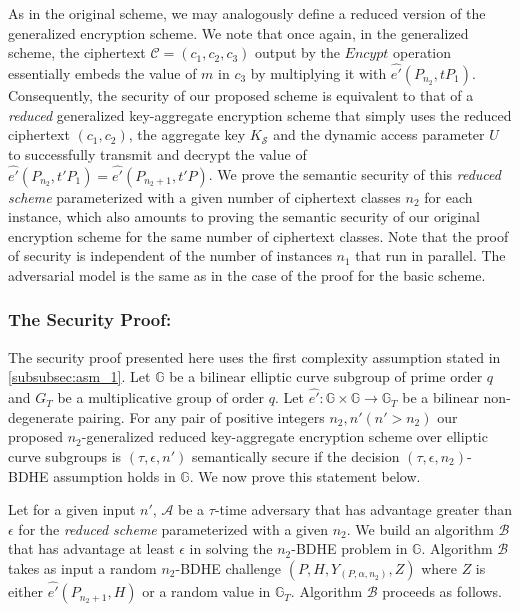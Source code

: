As in the original scheme, we may analogously define a reduced version of the generalized encryption scheme. We note that once again, in the generalized scheme, the ciphertext $\mathcal{C}=(c_1,c_2,c_3)$ output by the $Encypt$ operation essentially embeds the value of $m$ in $c_3$ by multiplying it with $\hat{e'}(P_{n_2},tP_1)$. Consequently, the security of our proposed scheme is equivalent to that of a \emph{reduced} generalized key-aggregate encryption scheme that simply uses the reduced ciphertext $(c_1,c_2)$, the aggregate key $K_{\mathcal{S}}$ and the dynamic access parameter $U$ to successfully transmit and decrypt the value of $\hat{e'}(P_{n_2},t'P_1)=\hat{e'}(P_{n_2+1},t'P)$. We prove the semantic security of this \emph{reduced scheme} parameterized with a given number of ciphertext classes $n_2$ for each instance, which also amounts to proving the semantic security of our original encryption scheme for the same number of ciphertext classes. Note that the proof of security is independent of the 
number of instances $n_1$ that run in parallel. The adversarial model is the same as in the case of the proof for the basic scheme.

\subsubsection{The Security Proof:}

The security proof presented here uses the first complexity assumption stated in \ref{subsubsec:asm_1}. Let $\mathbb{G}$ be a bilinear elliptic curve subgroup of prime order $q$ and $G_T$ be a multiplicative group of order $q$. Let $\hat{e'}:\mathbb{G} \times \mathbb{G}\longrightarrow\mathbb{G}_T$ be a bilinear non-degenerate pairing. For any pair of positive integers $n_2,n' (n'>n_2)$ our proposed $n_2$-generalized reduced key-aggregate encryption scheme over elliptic curve subgroups is $(\tau,\epsilon,n')$ semantically secure if the decision $(\tau,\epsilon,n_2)$-BDHE assumption holds in $\mathbb{G}$. We now prove this statement below.

\textbf{} Let for a given input $n'$, $\mathcal{A}$ be a $\tau$-time adversary that has advantage greater than $\epsilon$ for the \emph{reduced scheme} parameterized with a given $n_2$. We build an algorithm $\mathcal{B}$ that has advantage at least $\epsilon$ in solving the $n_2$-BDHE problem in $\mathbb{G}$. Algorithm $\mathcal{B}$ takes as input a random $n_2$-BDHE challenge $(P,H,Y_{(P,\alpha,n_2)},Z)$ where $Z$ is either $\hat{e'}(P_{n_2+1},H)$ or a random value in $\mathbb{G}_T$. Algorithm $\mathcal{B}$ proceeds as follows.

